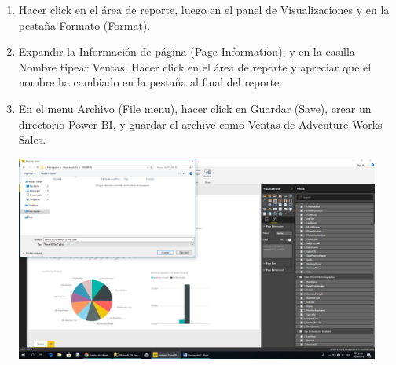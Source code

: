 \begin{itemize}
\begin{enumerate}
\item Hacer click en el área de reporte, luego en el panel de Visualizaciones y en la pestaña Formato (Format).
\item Expandir la Información de página (Page Information), y en la casilla Nombre tipear Ventas. Hacer click en el
área de reporte y apreciar que el nombre ha cambiado en la pestaña al final del reporte.
\item En el menu Archivo (File menu), hacer click en Guardar (Save), crear un directorio Power BI, y guardar el
archive como Ventas de Adventure Works Sales. 
\begin{center}
\includegraphics[width=12cm]{./Imagenes/18.png} 
\end{center}



\end{enumerate}


\end{itemize}







